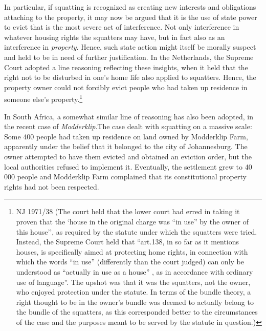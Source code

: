 In particular, if squatting is recognized as creating new interests and obligations attaching to the property, it may now be argued that  it is the use of state power to evict that is the most severe act of interference. Not only interference in whatever housing rights the squatters may have, but in fact also as an interference in {\it property}. Hence, such state action might itself be morally suspect and held to be in need of further justification. In the Netherlands, the Supreme Court adopted a line reasoning reflecting these insights, when it held that the right not to be disturbed in one's home life also applied to squatters. Hence, the property owner could not forcibly evict people who had taken up residence in someone else's property.\footnote{NJ 1971/38 (The court held that the lower court had erred in taking it proven that the `house in the original charge was ``in use'' by the owner of this house'', as required by the statute under which the squatters were tried. Instead, the Supreme Court held that ``art.138, in so far as it mentions houses, is specifically aimed at protecting home rights, in connection with which the words ``in use'' (differently than the court judged) can only be understood as ``actually in use as a house'' , as in accordance with ordinary use of language''. The upshot was that it was the squatters, not the owner, who enjoyed protection under the statute. In terms of the bundle theory, a right thought to be in the owner's bundle was deemed to actually belong to the bundle of the squatters, as this corresponded better to the circumstances of the case and the purposes meant to be served by the statute in question.)}

In South Africa, a somewhat similar line of reasoning has also been adopted, in the recent case of {\it Modderklip}.The case dealt with squatting on a massive scale: Some 400 people had taken up residence on land owned by Modderklip Farm, apparently under the belief that it belonged to the city of Johannesburg. The owner attempted to have them evicted and obtained an eviction order, but the local authorities refused to implement it. Eventually, the settlement grew to 40 000 people and Modderklip Farm complained that its constitutional property rights had not been respected.

